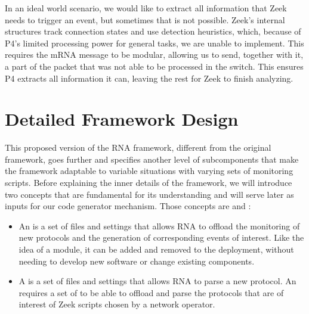 In an ideal world scenario, we would like to extract all information that Zeek needs to trigger an event, but sometimes that is not possible. Zeek's internal structures track connection states and use detection heuristics, which, because of P4's limited processing power for general tasks, we are unable to implement. This requires the mRNA message to be modular, allowing us to send, together with it, a part of the packet that was not able to be processed in the switch. This ensures P4 extracts all information it can, leaving the rest for Zeek to finish analyzing.

% 
\section{Detailed Framework Design}
\label{sec:rna:detailed_design}

This proposed version of the RNA framework, different from the original framework, goes further and specifies another level of subcomponents that make the framework adaptable to variable situations with varying sets of monitoring scripts. Before explaining the inner details of the framework, we will introduce two concepts that are fundamental for its understanding and will serve later as inputs for our code generator mechanism. Those concepts are \Offloader{} and \ProtocolTemplate{}:

\begin{itemize}
    \item An \textit{\Offloader{}} is a set of files and settings that allows RNA to offload the monitoring of new protocols and the generation of corresponding events of interest. Like the idea of a module, it can be added and removed to the deployment, without needing to develop new software or change existing components.

    \item A \textit{\ProtocolTemplate{}} is a set of files and settings that allows RNA to parse a new protocol. An \Offloader{} requires a set of \ProtocolTemplates{} to be able to offload and parse the protocols that are of interest of Zeek scripts chosen by a network operator.
\end{itemize}

